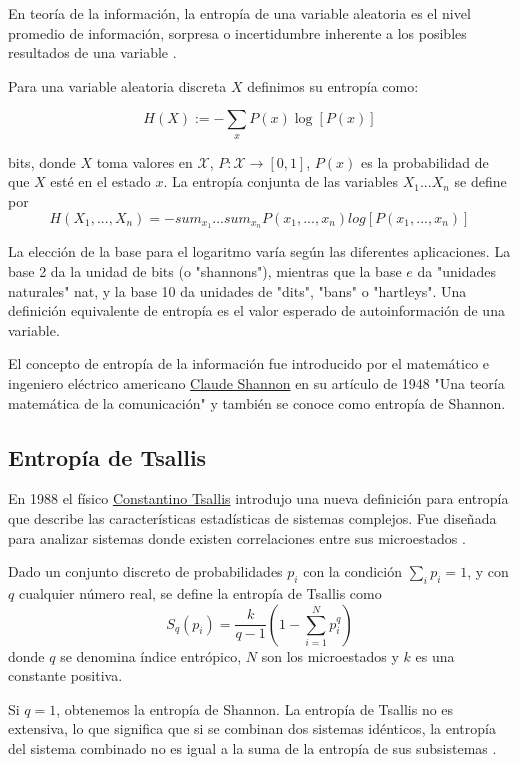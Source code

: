 En teoría de la información, la entropía de una variable aleatoria es el nivel promedio de información, 
sorpresa o incertidumbre inherente a los posibles resultados de una variable \cite{t-entropy}.
\begin{definicion}[Entropía] \label{def:entropy}
Para una variable aleatoria discreta $X$ definimos su entropía como:  

$$H(X):= - \sum_{x} P(x)\log[P(x)]$$

bits, donde $X$ toma valores en $\mathcal{X}$, $P:\mathcal{X} \rightarrow [0,1]$, $P(x)$ es la 
probabilidad de que $X$ esté en el estado $x$. La 
entropía conjunta de las variables $X_1...X_n$ se define por 
$$H(X_1,...,X_n)=-sum_{x_1}...sum_{x_n}P(x_1,...,x_n)log[P(x_1,...,x_n)]$$
\end{definicion}

La elección de la base para el logaritmo varía según las diferentes 
aplicaciones. La base 2 da la unidad de bits (o "shannons"), mientras que la base $e$ da "unidades naturales" 
nat, y la base 10 da unidades de "dits", "bans" o "hartleys". Una definición equivalente de entropía es 
el valor esperado de autoinformación de una variable.

El concepto de entropía de la información fue introducido por el matemático e ingeniero eléctrico americano 
\href{https://en.wikipedia.org/wiki/Claude_Shannon}{Claude Shannon} en su artículo 
de 1948 "Una teoría matemática de la comunicación" \cite{shannon-1948} y también se conoce como entropía de Shannon.


\subsection{Entropía de Tsallis}
En 1988 el físico \href{https://en.wikipedia.org/wiki/Constantino_Tsallis}{Constantino Tsallis} 
introdujo una nueva definición para entropía que describe las características estadísticas de sistemas 
complejos. Fue diseñada para analizar sistemas donde existen correlaciones entre sus microestados \cite{tsallis}.
\begin{definicion} \label{def:tsallis_entropy}
Dado un conjunto discreto de probabilidades ${p_i}$ con la condición $\sum_{i} p_i = 1$, y con $q$ 
cualquier número real, se define la entropía de Tsallis como
$$ S_q(p_i)=\frac{k}{q-1}(1- \sum_{i=1}^{N}p_{i}^{q})$$
donde $q$ se denomina índice entrópico, $N$ son los microestados y $k$ es una constante positiva.
\end{definicion}
Si $q = 1$, obtenemos la entropía de 
Shannon. La entropía de Tsallis no es extensiva, lo que significa que si se combinan dos sistemas idénticos, 
la entropía del sistema combinado no es igual a la suma de la entropía de sus subsistemas \cite{comparison-entropies}.
